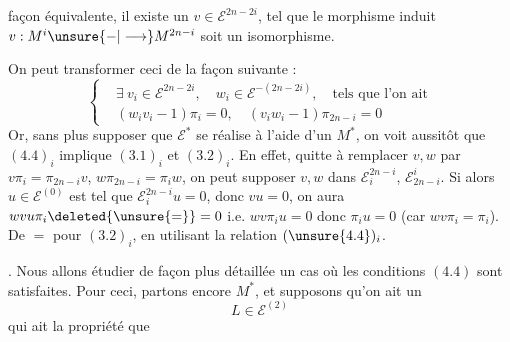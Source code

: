façon équivalente, il existe un $v\in\mathcal E^{2n-2i}$, tel que le morphisme induit $v:M^i\unsure{-|\longrightarrow}M^{2n-i}$ soit un isomorphisme.

On peut transformer ceci de la façon suivante :
\[
\left\{\begin{aligned}
&\exists\ v_i\in\mathcal E^{2n-2i},\quad w_i\in\mathcal E^{-(2n-2i)},\quad\text{tels que l'on ait}\\
&(w_iv_i-1)\pi_i=0,\quad(v_iw_i-1)\pi_{2n-i}=0
\end{aligned}\right.
\tag*{$(4.4)_i$}
\]
Or, sans plus supposer que $\mathcal E^*$ se réalise à l'aide d'un $M^*$, on voit aussitôt que $(4.4)_i$ implique $(3.1)_i$ et $(3.2)_i$. En effet, quitte à remplacer $v,w$ par $v\pi_i=\pi_{2n-i}v$, $w\pi_{2n-i}=\pi_iw$, on peut supposer $v,w$ dans $\mathcal E_i^{2n-i}$, $\mathcal E_{2n-i}^i$. Si alors  $u\in\mathcal E^{(0)}$ est tel que $\mathcal E_i^{2n-i}u=0$, donc $vu=0$, on aura $wvu\pi_i\deleted{\unsure{=}}=0$ i.e. $wv\pi_i u=0$ donc $\pi_i u=0$ (car $wv\pi_i=\pi_i$). De $=$ pour $(3.2)_i$, en utilisant la  relation $(\unsure{4.4})_i$.


. Nous allons étudier de façon plus détaillée un cas où les conditions $(4.4)$ sont satisfaites. Pour ceci, partons encore  $M^*$,  et supposons qu'on ait un
\[
L\in\mathcal E^{(2)}
\tag{6.0}
\]
qui ait la propriété que
